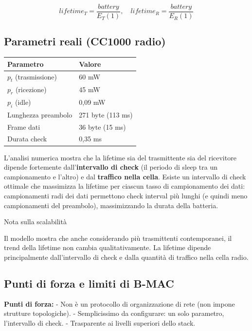 \documentclass[
  italian,
  openany]{book}
\newcounter{none} %
\begin{document}
\[lifetime_T = \frac{battery}{E_T(1)}, \quad lifetime_R = \frac{battery}{E_R(1)}\]

\subsection{Parametri reali (CC1000
radio)}\label{parametri-reali-cc1000-radio}

{\def\LTcaptype{none} %
\begin{longtable}[]{@{}ll@{}}
\toprule\noalign{}
Parametro & Valore \\
\midrule\noalign{}
\endhead
\bottomrule\noalign{}
\endlastfoot
\(p_t\) (trasmissione) & 60 mW \\
\(p_r\) (ricezione) & 45 mW \\
\(p_i\) (idle) & 0,09 mW \\
Lunghezza preambolo & 271 byte (113 ms) \\
Frame dati & 36 byte (15 ms) \\
Durata check & 0,35 ms \\
\end{longtable}
}

L'analisi numerica mostra che la lifetime sia del trasmittente sia del
ricevitore dipende fortemente dall'\textbf{intervallo di check} (il
periodo di sleep tra un campionamento e l'altro) e dal \textbf{traffico
nella cella}. Esiste un intervallo di check ottimale che massimizza la
lifetime per ciascun tasso di campionamento dei dati: campionamenti radi
dei dati permettono check interval più lunghi (e quindi meno
campionamenti del preambolo), massimizzando la durata della batteria.

\begin{calloutnote}{Nota sulla scalabilità}

Il modello mostra che anche considerando più trasmittenti contemporanei,
il trend della lifetime non cambia qualitativamente. La lifetime dipende
principalmente dall'intervallo di check e dalla quantità di traffico
nella cella radio.

\end{calloutnote}

\subsection{Punti di forza e limiti di
B-MAC}\label{punti-di-forza-e-limiti-di-b-mac}

\textbf{Punti di forza:} - Non è un protocollo di organizzazione di rete
(non impone strutture topologiche). - Semplicissimo da configurare: un
solo parametro, l'intervallo di check. - Trasparente ai livelli
superiori dello stack.
\end{document}
